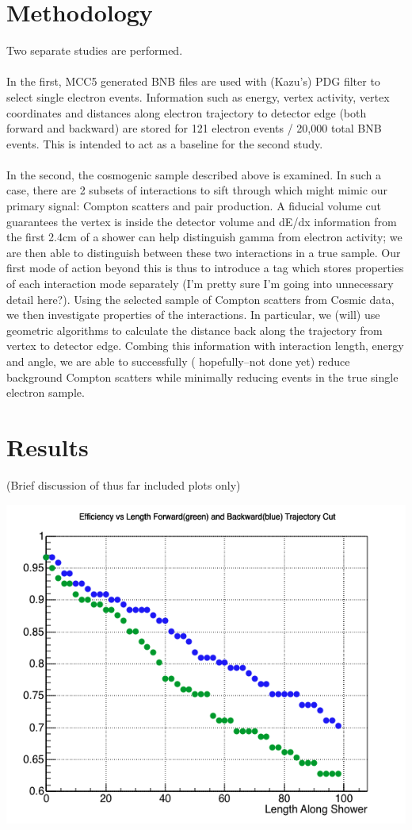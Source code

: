 \documentclass[10pt]{article}
\begin{document}
\section{Methodology}
Two separate studies are performed.  
\\ \\In the first, MCC5 generated BNB files are used with (Kazu's) PDG filter to select single electron events.  Information such as energy, vertex activity, vertex coordinates and distances along electron trajectory to detector edge (both forward and backward) are stored for 121 electron events / 20,000 total BNB events.  This is intended to act as a baseline for the second study.  
\\ \\  In the second, the cosmogenic sample described above is examined.  In such a case, there are 2 subsets of interactions to sift through which might mimic our primary signal: Compton scatters and pair production.  A fiducial volume cut guarantees the vertex is inside the detector volume and dE/dx information from the first 2.4cm of a shower can help distinguish gamma from electron activity; we are then able to distinguish between these two interactions in a true sample.  Our first mode of action beyond this is thus to introduce a tag which stores properties of each interaction mode separately (I'm pretty sure I'm going into unnecessary detail here?). Using the selected sample of Compton scatters from Cosmic data, we then investigate properties of the interactions.  In particular, we (will) use geometric algorithms to calculate the distance back along the trajectory from vertex to detector edge.  Combing this information with interaction length, energy and angle, we are able to successfully ( hopefully--not done yet) reduce background Compton scatters while minimally reducing events in the true single electron sample. 


\section{Results}

(Brief discussion of thus far included plots only)

\includegraphics[scale=0.5]{Eff.png}
\end{document}
